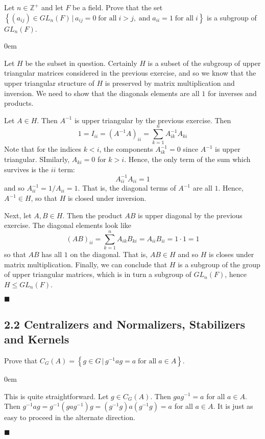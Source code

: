 \documentclass[12pt]{article}
\renewcommand{\qed}{\hfill$\blacksquare$}
\renewenvironment{proof}{\begin{addmargin}[1em]{0em}\begin{newproof}}{\end{newproof}\end{addmargin}\qed}
\newenvironment{problem}[2][Exercise]{\begin{trivlist}
\item[\hskip \labelsep {\bfseries #1}\hskip \labelsep {\bfseries #2.}]}{\end{trivlist}}
\begin{document}
\begin{problem}{1.2.17}
Let $n\in \mathbb{Z}^+$ and let $F$ be a field. Prove that the set \\ $\left\{ \left(a_{ij}\right)\in GL_n\left(F\right) \, | \, a_{ij}=0 \; \text{for all} \; i>j, \; \text{and} \; a_{ii}=1 \; \text{for all} \; i \right\} $ is a subgroup of $GL_n\left(F\right)$.
\end{problem}
\begin{proof}
Let $H$ be the subset in question. Certainly $H$ is a subset of the subgroup of upper triangular matrices considered in the previous exercise, and so we know that the upper triangular structure of $H$ is preserved by matrix multiplication and inversion. We need to show that the diagonals elements are all $1$ for inverses and products.

Let $A\in H$. Then $A^{-1}$ is upper triangular by the previous exercise. Then \[ 1=I_{ii} = \left(A^{-1}A\right)_{ii} = \sum_{k=1}^n A^{-1}_{ik}A_{ki}  \] Note that for the indices $k<i$, the components $A_{ik}^{-1} = 0$ since $A^{-1}$ is upper triangular. SImilarly, $A_{ki}=0$ for $k>i$. Hence, the only term of the sum which survives is the $ii$ term: \[ A_{ii}^{-1}A_{ii} = 1 \] and so $A_{ii}^{-1} = 1/ A_{ii} = 1$. That is, the diagonal terms of $A^{-1}$ are all $1$. Hence, $A^{-1}\in H$, so that $H$ is closed under inversion.

Next, let $A,B\in H$. Then the product $AB$ is upper diagonal by the previous exercise. The diagonal elements look like \[ \left(AB\right)_{ii} = \sum_{k=1}^n A_{ik}B_{ki} = A_{ii}B_{ii} = 1\cdot 1 = 1\] so that $AB$ has all $1$ on the diagonal. That is, $AB\in H$ and so $H$ is closes under matrix multiplication. Finally, we can conclude that $H$ is a subgroup of the group of upper triangular matrices, which is in turn a subgroup of $GL_n\left(F\right)$, hence $H\leq GL_n\left(F\right)$.
\end{proof}








\subsection*{2.2 Centralizers and Normalizers, Stabilizers and Kernels}

\begin{problem}{2.2.1}
Prove that $C_G\left(A\right) = \left\{ g\in G\, | \, g^{-1}ag=a \; \text{for all} \; a\in A\right\}$.
\end{problem}
\begin{proof}
This is quite straightforward. Let $g \in C_G\left(A\right)$. Then $gag^{-1} =a $ for all $a\in A$. Then $g^{-1} a g = g^{-1}\left(gag^{-1}\right)g = \left(g^{-1}g\right)a\left(g^{-1}g\right) = a $ for all $a\in A$. It is just as easy to proceed in the alternate direction. 
\end{proof}
\end{document}
